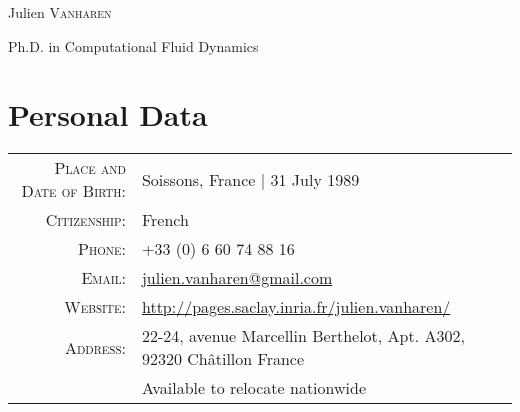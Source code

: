 \documentclass[a4paper,10pt]{article}
\begin{document}
\pagestyle{empty}
\par{\begin{center}
        {\Huge Julien \textsc{Vanharen}}
        \smallskip\par{\Large Ph.D. in Computational Fluid Dynamics} \end{center}}
\smallskip\par

\section{Personal Data}
\begin{tabular}{rl}
    \textsc{Place and Date of Birth:} & Soissons, France | 31 July 1989                                        \\
    \textsc{Citizenship:}             & French                                                                 \\
    \textsc{Phone:}                   & +33 (0) 6 60 74 88 16                                                  \\
    \textsc{Email:}                   & \href{mailto:julien.vanharen@gmail.com}{julien.vanharen@gmail.com}     \\
    \textsc{Website:}                 & \url{http://pages.saclay.inria.fr/julien.vanharen/}                    \\
    \textsc{Address:}                 & 22-24, avenue Marcellin Berthelot, Apt. A302, 92320 Ch\^atillon France \\
                                      & Available to relocate nationwide                                       \\
\end{tabular}
\end{document}
